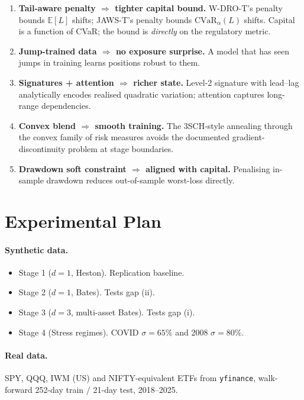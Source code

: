 \documentclass[11pt,a4paper]{article}
\begin{document}
\begin{enumerate}[leftmargin=*]
  \item \textbf{Tail-aware penalty $\Rightarrow$ tighter capital bound.}
    W-DRO-T's penalty bounds $\mathbb{E}[L]$ shifts; JAWS-T's penalty bounds
    $\mathrm{CVaR}_\alpha(L)$ shifts. Capital is a function of CVaR; the
    bound is \emph{directly} on the regulatory metric.
  \item \textbf{Jump-trained data $\Rightarrow$ no exposure surprise.} A model
    that has seen jumps in training learns positions robust to them.
  \item \textbf{Signatures + attention $\Rightarrow$ richer state.} Level-2
    signature with lead--lag analytically encodes realised quadratic
    variation; attention captures long-range dependencies.
  \item \textbf{Convex blend $\Rightarrow$ smooth training.} The 3SCH-style
    annealing through the convex family of risk measures avoids the
    documented gradient-discontinuity problem at stage boundaries.
  \item \textbf{Drawdown soft constraint $\Rightarrow$ aligned with capital.}
    Penalising in-sample drawdown reduces out-of-sample worst-loss directly.
\end{enumerate}

\section{Experimental Plan}

\paragraph{Synthetic data.}
\begin{itemize}[leftmargin=*]
  \item Stage 1 ($d=1$, Heston). Replication baseline.
  \item Stage 2 ($d=1$, Bates). Tests gap (ii).
  \item Stage 3 ($d=3$, multi-asset Bates). Tests gap (i).
  \item Stage 4 (Stress regimes). COVID $\sigma=65\%$ and 2008 $\sigma=80\%$.
\end{itemize}

\paragraph{Real data.} SPY, QQQ, IWM (US) and NIFTY-equivalent ETFs from
\texttt{yfinance}, walk-forward 252-day train / 21-day test, 2018--2025.
\end{document}
